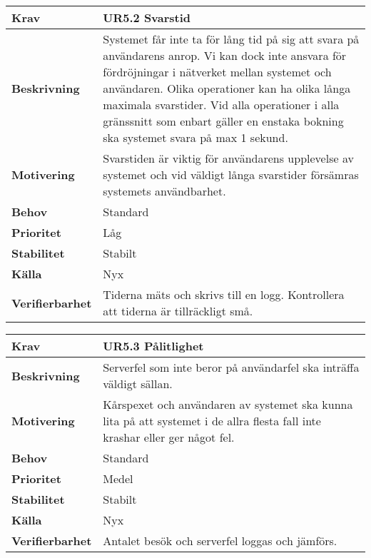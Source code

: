 \documentclass[a4paper, twoside, 11pt, titlepage]{article}
\begin{document}
		\begin {table} [ht] \begin{tabular} { p{2.6cm} p{12.5cm} }
			\hline
			{\sffamily\textbf{Krav}} & {\sffamily\textbf{UR5.2 Svarstid}} \\
			\hline
			{\sffamily\textbf{Beskrivning}} & {Systemet får inte ta för lång tid på sig att svara på användarens anrop. Vi kan dock inte ansvara för fördröjningar i nätverket mellan systemet och användaren. Olika operationer kan ha olika långa maximala svarstider. Vid alla operationer i alla gränssnitt som enbart gäller en enstaka bokning ska systemet svara på max 1 sekund.} \\
			\hline
			{\sffamily\textbf{Motivering}} & {Svarstiden är viktig för användarens upplevelse av systemet och vid väldigt långa svarstider försämras systemets användbarhet.} \\
			\hline
			{\sffamily\textbf{Behov}} & {Standard} \\
			\hline
			{\sffamily\textbf{Prioritet}} & {Låg} \\
			\hline
			{\sffamily\textbf{Stabilitet}} & {Stabilt} \\
			\hline
			{\sffamily\textbf{Källa}} & {Nyx} \\
			\hline
			{\sffamily\textbf{Verifierbarhet}} & {Tiderna mäts och skrivs till en logg. Kontrollera att tiderna är tillräckligt små.} \\
			\hline
		\end{tabular} \end{table} \FloatBarrier
		\vspace{6mm}

		\begin {table} [ht] \begin{tabular} { p{2.6cm} p{12.5cm} }
			\hline
			{\sffamily\textbf{Krav}} & {\sffamily\textbf{UR5.3 Pålitlighet}} \\
			\hline
			{\sffamily\textbf{Beskrivning}} & {Serverfel som inte beror på användarfel ska inträffa väldigt sällan.} \\
			\hline
			{\sffamily\textbf{Motivering}} & {Kårspexet och användaren av systemet ska kunna lita på att systemet i de allra flesta fall inte krashar eller ger något fel.} \\
			\hline
			{\sffamily\textbf{Behov}} & {Standard} \\
			\hline
			{\sffamily\textbf{Prioritet}} & {Medel} \\
			\hline
			{\sffamily\textbf{Stabilitet}} & {Stabilt} \\
			\hline
			{\sffamily\textbf{Källa}} & {Nyx} \\
			\hline
			{\sffamily\textbf{Verifierbarhet}} & {Antalet besök och serverfel loggas och jämförs.} \\
			\hline
		\end{tabular} \end{table} \FloatBarrier
		\vspace{6mm}
\end{document}
